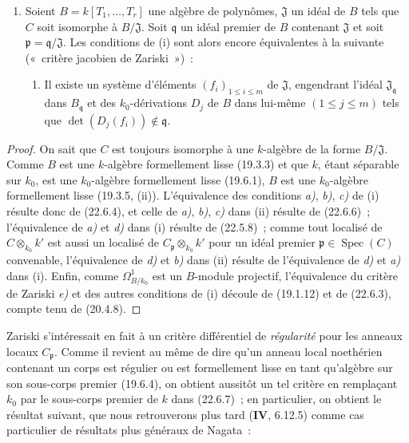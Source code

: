 \begin{proposition}[22.6.7]
\begin{enumerate}
  \item[\rm(iii)] Soient $B=k[T_1,\ldots,T_r]$ une algèbre de polynômes,
  $\mathfrak J$ un idéal de $B$ tels que $C$ soit isomorphe à
  $B/\mathfrak J$. Soit $\mathfrak q$ un idéal premier de $B$ contenant
  $\mathfrak J$ et soit $\mathfrak p=\mathfrak q/\mathfrak J$. Les conditions
  de \textup{(i)} sont alors encore équivalentes à la suivante \textup{(«~critère jacobien de
  Zariski~»)}~:
  \begin{enumerate}
    \item[\textup{e)}] Il existe un système d'éléments
    $(f_i)_{1\leq i\leq m}$ de $\mathfrak J$, engendrant l'idéal
    $\mathfrak J_{\mathfrak q}$ dans $B_{\mathfrak q}$ et des
    $k_0$-dérivations $D_j$ de $B$ dans lui-même $(1\leq j\leq m)$ tels que
    $\det(D_j(f_i))\notin\mathfrak q$.
  \end{enumerate}
\end{enumerate}
\end{proposition}

\begin{proof}
On sait que $C$ est toujours isomorphe à une $k$-algèbre de la forme
$B/\mathfrak J$. Comme $B$ est une $k$-algèbre formellement lisse (19.3.3) et
que $k$, étant séparable sur $k_0$, est une $k_0$-algèbre formellement lisse
(19.6.1), $B$ est une $k_0$-algèbre formellement lisse (19.3.5, (ii)).
L'équivalence des conditions \emph{a)}, \emph{b)}, \emph{c)} de (i) résulte donc de (22.6.4), et
celle de \emph{a)}, \emph{b)}, \emph{c)} dans (ii) résulte de (22.6.6)~; l'équivalence de \emph{a)} et \emph{d)}
dans (i) résulte de (22.5.8)~; comme tout localisé de $C\otimes_{k_0}k'$ est
aussi un localisé de $C_{\mathfrak p}\otimes_{k_0}k'$ pour un idéal premier
$\mathfrak p\in\operatorname{Spec}(C)$ convenable, l'équivalence de \emph{d)} et \emph{b)} dans (ii)
résulte de l'équivalence de \emph{d)} et \emph{a)} dans (i). Enfin, comme
$\Omega^1_{B/k_0}$ est un $B$-module projectif, l'équivalence du critère de
Zariski \emph{e)} et des autres conditions de (i) découle de (19.1.12) et de
(22.6.3), compte tenu de (20.4.8).
\end{proof}

Zariski s'intéressait en fait à un critère différentiel de \emph{régularité} pour les
anneaux locaux $C_{\mathfrak p}$. Comme il revient au même de dire qu'un anneau
local noethérien contenant un corps est régulier ou est formellement lisse en
tant qu'algèbre sur son sous-corps premier (19.6.4), on obtient aussitôt un tel
critère en remplaçant $k_0$ par le sous-corps premier de $k$ dans (22.6.7)~; en
particulier, on obtient le résultat suivant, que nous retrouverons plus tard
(\textbf{IV}, 6.12.5) comme cas particulier de résultats plus généraux de Nagata~:


